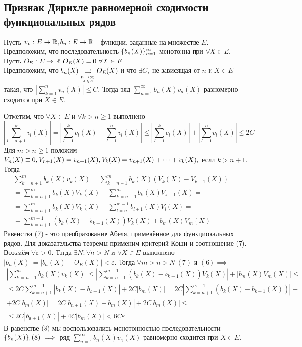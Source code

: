 \documentclass[main]{subfiles}
\begin{document}
\subsection{Признак Дирихле равномерной сходимости функциональных рядов}
\begin{theorem} 
    Пусть $v_n:E\to{\vR}, b_n:E\to{\vR}$ - функции, заданные на множестве $E.$
     Предположим, что последовательность $\fnn[b_n(X)]$ монотонна при $\forall X\in E.
     $ Пусть $O_E:E\to{\vR}, O_E(X)=0\ \forall X\in E.$\\
Предположим, что $b_n(X)\darrow{\underset{X\in E}{n\to\infty}}O_E(X)$ 
и что $\exists C,$ не зависящая от $n$ и $X\in E$ такая, что $|\sum_{k=1}^n v_n(X)|\leq C.$ 
Тогда ряд $\sum^{\infty}_{n=1} b_n(X)v_n(X)$ равномерно сходится при $X\in E.$ \end{theorem}
\begin{longProof} 
    Отметим, что $\forall X\in E$ и $\forall k>n\geq 1$ выполнено
     \[ \left|\sum_{l=n+1}^k v_l(X)\right|=\left|\sum_{l=1}^k v_l(X)-\sum_{l=1}^n v_l(X)\right|\leq
      |\sum_{l=1}^k v_l(X)|+|\sum_{l=1}^n v_l(X)|\leq 2C\tag{6} \]
Для $m>n\geq 1$ положим $V_n(X)\equiv0, V_{n+1}(X)=v_{n+1}(X),\\
 V_k(X)=v_{n+1}(X)
+\dots+v_k(X),$ если $k>n+1.$ Тогда
\begin{multline*}
 \sum_{k=n+1}^m b_k(X)v_k(X)=\sum_{k=n+1}^m b_k(X)(V_k(X)-V_{k-1}(X))= \\
=\sum_{k=n+1}^m b_k(X)V_k(X)-\sum_{k=n+1}^m b_k(X)V_{k-1}(X)= \\
=\sum_{k=n+1}^m b_k(X)V_k(X)-\sum_{l=n}^{m-1} b_{l+1}(X)V_l(X)= \\
=\sum_{k=n+1}^{m-1}(b_k(X)-b_{k+1}(X))V_k(X)+b_m(X)V_m(X)\tag{7} \end{multline*}
Равенства (7) - это преобразование Абеля, применённое для функциональных рядов. 
Для доказательства теоремы применим критерий Коши и соотношение (7). \\
Возьмём $\forall\varepsilon>0.$ Тогда $\exists N:\forall n>N$ и $\forall X\in E$ 
выполнено\\ $|b_n(X)|=|b_n(X)-O_E(X)|<\varepsilon.$ Тогда $\forall m>n>N\ (7)$ и
 $(6) \implies$
 \begin{multline*}
  |\sum_{k=n+1}^m b_k(X)v_k(X)|\leq |\sum_{k=n+1}^{m-1}(b_k(X)-b_{k+1}(X))V_k(X)|+|b_m(X)V_m(X)|\leq \\
\leq 2C\sum_{k=n+1}^{m-1}|b_k(X)-b_{k+1}(X)|+2C|b_m(X)|=2C|\sum_{k=n+1}^{m-1}(b_k(X)-b_{k+1}(X))|+ \\
+ 2C|b_m(X)|=2C|b_{n+1}(X)-b_m(X)|+2C|b_m(X)|\leq \\
 \leq 2C|b_{n+1}(X)|+4C|b_m(X)|<6C\varepsilon\tag{8} 
\end{multline*}
В равенстве (8) мы воспользовались монотонностью последовательности
 $\fn[b_n(X)], (8) \implies $ ряд $\sum^{\infty}_{n=1} b_n(X)v_n(X)$ равномерно сходится при $X\in E.$ 
\end{longProof}
\end{document}
